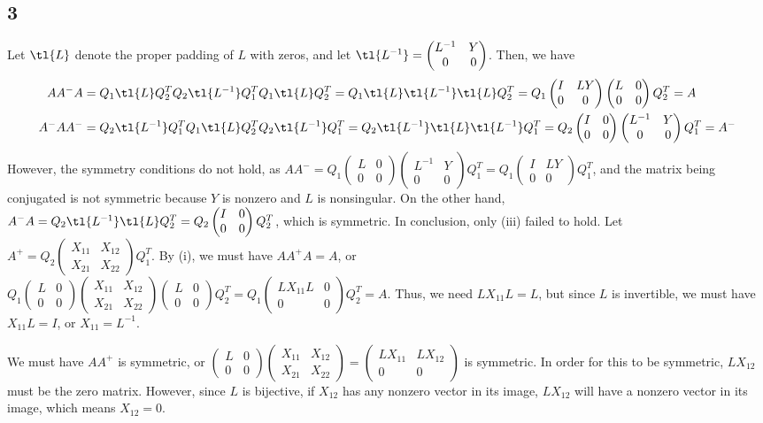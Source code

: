 \documentclass{article}
\newcommand{\openm}{\begin{pmatrix}}
\newcommand{\closem}{\end{pmatrix}}
\begin{document}
\subsection*{3}
Let $\tl{L}$ denote the proper padding of $L$ with zeros, and let $\tl{L^{-1}}=\openm L^{-1}&Y\\0&0\closem$. Then, we have
\begin{align*}
    AA^{-}A&=Q_1\tl{L}Q_2^TQ_2\tl{L^{-1}}Q_1^TQ_1\tl{L}Q_2^T=Q_1\tl{L}\tl{L^{-1}}\tl{L}Q_2^T=Q_1\openm I&LY\\0&0\closem\openm L&0\\0&0\closem Q_2^T=A\\
    A^{-}AA^{-}&=Q_2\tl{L^{-1}}Q_1^TQ_1\tl{L}Q_2^TQ_2\tl{L^{-1}}Q_1^T=Q_2\tl{L^{-1}}\tl{L}\tl{L^{-1}}Q_1^T=Q_2\openm I&0\\0&0\closem\openm L^{-1}&Y\\0&0\closem Q_1^T=A^{-}\\
\end{align*}
However, the symmetry conditions do not hold, as $AA^{-}=Q_1\openm L&0\\0&0\closem\openm L^{-1}&Y\\0&0\closem Q_1^T=Q_1\openm I&LY\\0&0\closem Q_1^T$, and the matrix being conjugated is not symmetric because $Y$ is nonzero and $L$ is nonsingular. On the other hand, $A^{-}A=Q_2\tl{L^{-1}}\tl{L}Q_2^T=Q_2\openm I&0\\0&0\closem Q_2^T$, which is symmetric. In conclusion, only (iii) failed to hold.
Let $A^+=Q_2\openm X_{11}&X_{12}\\X_{21}&X_{22}\closem Q_1^T$. By (i), we must have $AA^+A=A$, or \\
$Q_1\openm L&0\\0&0\closem\openm X_{11}&X_{12}\\X_{21}&X_{22}\closem\openm L&0\\0&0\closem Q_2^T=Q_1\openm LX_{11}L&0\\0&0\closem Q_2^T=A$. Thus, we need $LX_{11}L=L$, but since $L$ is invertible, we must have $X_{11}L=I$, or $X_{11}=L^{-1}$.

We must have $AA^+$ is symmetric, or $\openm L&0\\0&0\closem\openm X_{11}&X_{12}\\X_{21}&X_{22}\closem=\openm LX_{11}&LX_{12}\\0&0\closem$ is symmetric. In order for this to be symmetric, $LX_{12}$ must be the zero matrix. However, since $L$ is bijective, if $X_{12}$ has any nonzero vector in its image, $LX_{12}$ will have a nonzero vector in its image, which means $X_{12}=0$.
\end{document}
